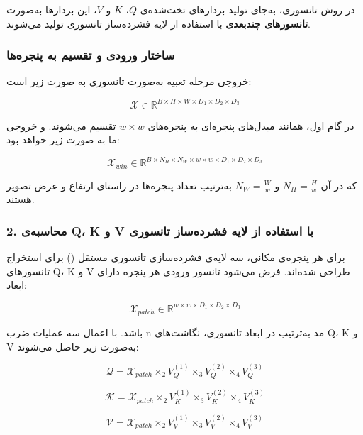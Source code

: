 در روش تانسوری، به‌جای تولید بردارهای تخت‌شده‌ی $Q$، $K$ و $V$، این بردارها به‌صورت \textbf{تانسورهای چندبعدی} با استفاده از لایه فشرده‌ساز تانسوری تولید می‌شوند.

\subsubsection*{ساختار ورودی و تقسیم به پنجره‌ها}

خروجی مرحله تعبیه به‌صورت تانسوری به صورت زیر است:

\[
\mathcal{X} \in \mathbb{R}^{B \times H \times W \times D_1 \times D_2 \times D_3}
\]

در گام اول، همانند مبدل‌های پنجره‌ای به پنجره‌های $w \times w$ تقسیم می‌شوند. و خروجی ما به صورت زیر خواهد بود:

\[
\mathcal{X}_{win} \in \mathbb{R}^{B \times N_H \times N_W \times w \times w \times D_1 \times D_2 \times D_3}
\]

که در آن $N_H = \frac{H}{w}$ و $N_W = \frac{W}{w}$ به‌ترتیب تعداد پنجره‌ها در راستای ارتفاع و عرض تصویر هستند.

\subsubsection*{2. محاسبه‌ی Q، K و V با استفاده از لایه فشرده‌ساز تانسوری}

برای هر پنجره‌ی مکانی، سه لایه‌ی فشرده‌سازی تانسوری مستقل () برای استخراج تانسورهای Q، K و V طراحی شده‌اند. فرض می‌شود تانسور ورودی هر پنجره دارای ابعاد:

\[
\mathcal{X}_{patch} \in \mathbb{R}^{w \times w \times D_1 \times D_2 \times D_3}
\]

باشد. با اعمال سه عملیات ضرب n-مد به‌ترتیب در ابعاد تانسوری، نگاشت‌های Q، K و V به‌صورت زیر حاصل می‌شوند:

\begin{equation}
	\mathcal{Q} = \mathcal{X}_{patch} \times_2 V_Q^{(1)} \times_3 V_Q^{(2)} \times_4 V_Q^{(3)}
\end{equation}

\begin{equation}
	\mathcal{K} = \mathcal{X}_{patch} \times_2 V_K^{(1)} \times_3 V_K^{(2)} \times_4 V_K^{(3)}
\end{equation}

\begin{equation}
	\mathcal{V} = \mathcal{X}_{patch} \times_2 V_V^{(1)} \times_3 V_V^{(2)} \times_4 V_V^{(3)}
\end{equation}

